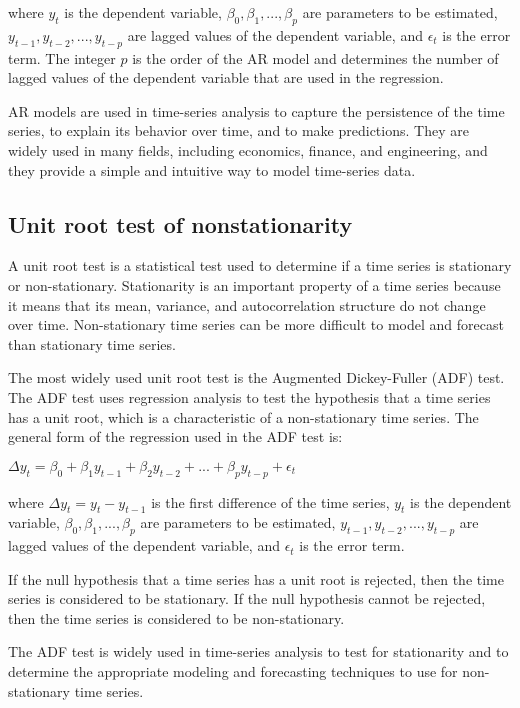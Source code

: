 \documentclass[12pt, a4paper, oneside]{article}
\begin{document}
where $y_t$ is the dependent variable, $\beta_0, \beta_1, ..., \beta_p$ are parameters to be estimated, $y_{t-1}, y_{t-2}, ..., y_{t-p}$ are lagged values of the dependent variable, and $\epsilon_t$ is the error term. The integer $p$ is the order of the AR model and determines the number of lagged values of the dependent variable that are used in the regression.

AR models are used in time-series analysis to capture the persistence of the time series, to explain its behavior over time, and to make predictions. They are widely used in many fields, including economics, finance, and engineering, and they provide a simple and intuitive way to model time-series data.

\subsection{ Unit root test of nonstationarity }
A unit root test is a statistical test used to determine if a time series is stationary or non-stationary. Stationarity is an important property of a time series because it means that its mean, variance, and autocorrelation structure do not change over time. Non-stationary time series can be more difficult to model and forecast than stationary time series.

The most widely used unit root test is the Augmented Dickey-Fuller (ADF) test. The ADF test uses regression analysis to test the hypothesis that a time series has a unit root, which is a characteristic of a non-stationary time series. The general form of the regression used in the ADF test is:

$\Delta y_t = \beta_0 + \beta_1 y_{t-1} + \beta_2 y_{t-2} + ... + \beta_p y_{t-p} + \epsilon_t$

where $\Delta y_t = y_t - y_{t-1}$ is the first difference of the time series, $y_t$ is the dependent variable, $\beta_0, \beta_1, ..., \beta_p$ are parameters to be estimated, $y_{t-1}, y_{t-2}, ..., y_{t-p}$ are lagged values of the dependent variable, and $\epsilon_t$ is the error term.

If the null hypothesis that a time series has a unit root is rejected, then the time series is considered to be stationary. If the null hypothesis cannot be rejected, then the time series is considered to be non-stationary.

The ADF test is widely used in time-series analysis to test for stationarity and to determine the appropriate modeling and forecasting techniques to use for non-stationary time series.
\end{document}
